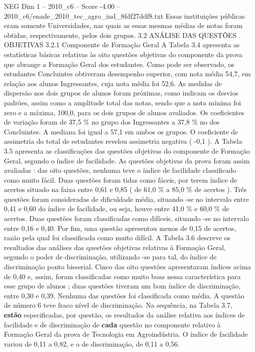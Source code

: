 \begin{textsample}{NEG Dim 1 – 2010\_c6 – Score -4.00 – 2010\_c6/enade\_2010\_tec\_agro\_ind\_8fdf27ddf8.txt}
Essas instituições públicas eram somente Universidades, nas quais as essas mesmas médias de notas foram obtidas, respectivamente, pelos dois grupos. 3.2 ANÁLISE DAS QUESTÕES OBJETIVAS 3.2.1 Componente de Formação Geral A Tabela 3.4 apresenta as estatísticas básicas relativas às oito questões objetivas do componente da prova que abrange a Formação Geral dos estudantes.
Como pode ser observado, os estudantes Concluintes obtiveram desempenho superior, com nota média 54,7, em relação aos alunos Ingressantes, cuja nota média foi 52,6.
As medidas de dispersão nos dois grupos de alunos foram próximas, como indicam os desvios padrões, assim como a amplitude total das notas, sendo que a nota mínima foi zero e a máxima, 100,0, para os dois grupos de alunos avaliados.
Os coeficientes de variação foram de 37,5 \% no grupo dos Ingressantes a 37,8 \% no dos Concluintes.
A mediana foi igual a 57,1 em ambos os grupos.
O coeficiente de assimetria do total de estudantes revelou assimetria negativa ( -0,1 ).
A Tabela 3.5 apresenta as classificações das questões objetivas do componente de Formação Geral, segundo o índice de facilidade.
As questões objetivas da prova foram assim avaliadas : das oito questões, nenhuma teve o índice de facilidade classificado como muito fácil.
Duas questões foram tidas como fáceis, por terem índice de acertos situado na faixa entre 0,61 e 0,85 ( de 61,0 \% a 85,0 \% de acertos ).
Três questões foram consideradas de dificuldade média, situando -se no intervalo entre 0,41 e 0,60 do índice de facilidade, ou seja, houve entre 41,0 \% e 60,0 \% de acertos.
Duas questões foram classificadas como difíceis, situando -se no intervalo entre 0,16 e 0,40.
Por fim, uma questão apresentou menos de 0,15 de acertos, razão pela qual foi classificada como muito difícil.
A Tabela 3.6 descreve os resultados das análises das questões objetivas relativas à Formação Geral, segundo o poder de discriminação, utilizando -se para tal, do índice de discriminação ponto bisserial.
Cinco das oito questões apresentaram índices acima de 0,40 e, assim, foram classificadas como muito boas nessa característica para esse grupo de alunos ; duas questões tiveram um bom índice de discriminação, entre 0,30 e 0,39.
Nenhuma das questões foi classificada como média.
A questão de número 6 teve fraco nível de discriminação.
Na sequência, na Tabela 3.7, \textbf{estão} especificadas, por questão, os resultados da análise relativa aos índices de facilidade e de discriminação de \textbf{cada} questão no componente relativo à Formação Geral da prova de Tecnologia em Agroindústria.
O índice de facilidade variou de 0,11 a 0,82, e o de discriminação, de 0,11 a 0,56.

\end{textsample}
